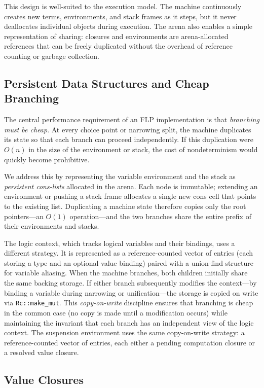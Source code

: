 This design is well-suited to the execution model. The machine continuously
creates new terms, environments, and stack frames as it steps, but it never
deallocates individual objects during execution. The arena also enables a
simple representation of sharing: closures and environments are arena-allocated
references that can be freely duplicated without the overhead of reference
counting or garbage collection.

\subsection{Persistent Data Structures and Cheap Branching}

The central performance requirement of an FLP implementation is that
\emph{branching must be cheap}. At every choice point or narrowing split, the
machine duplicates its state so that each branch can proceed independently. If
this duplication were $O(n)$ in the size of the environment or stack, the cost
of nondeterminism would quickly become prohibitive.

We address this by representing the variable environment and the stack as
\emph{persistent cons-lists} allocated in the arena. Each node is immutable;
extending an environment or pushing a stack frame allocates a single new cons
cell that points to the existing list. Duplicating a machine state therefore
copies only the root pointers---an $O(1)$ operation---and the two branches
share the entire prefix of their environments and stacks.

The logic context, which tracks logical variables and their bindings, uses a
different strategy. It is represented as a reference-counted vector of entries
(each storing a type and an optional value binding) paired with a union-find
structure for variable aliasing. When the machine branches, both children
initially share the same backing storage. If either branch subsequently modifies
the context---by binding a variable during narrowing or unification---the
storage is copied on write via \texttt{Rc::make\_mut}. This \emph{copy-on-write}
discipline ensures that branching is cheap in the common case (no copy is made
until a modification occurs) while maintaining the invariant that each branch
has an independent view of the logic context. The suspension environment uses
the same copy-on-write strategy: a reference-counted vector of entries, each
either a pending computation closure or a resolved value closure.

\subsection{Value Closures}

